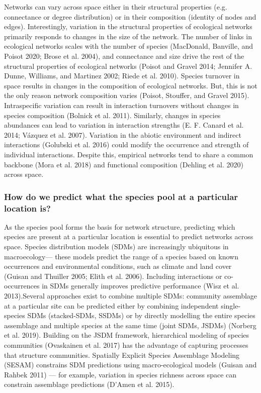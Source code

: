 \documentclass[11pt]{article}
\begin{document}
Networks can vary across space either in their structural properties
(e.g. connectance or degree distribution) or in their composition
(identity of nodes and edges). Interestingly, variation in the
structural properties of ecological networks primarily responds to
changes in the size of the network. The number of links in ecological
networks scales with the number of species (MacDonald, Banville, and
Poisot 2020; Brose et al. 2004), and connectance and size drive the rest
of the structural properties of ecological networks (Poisot and Gravel
2014; Jennifer A. Dunne, Williams, and Martinez 2002; Riede et al.
2010). Species turnover in space results in changes in the composition
of ecological networks. But, this is not the only reason network
composition varies (Poisot, Stouffer, and Gravel 2015). Intraspecific
variation can result in interaction turnovers without changes in species
composition (Bolnick et al. 2011). Similarly, changes in species
abundances can lead to variation in interaction strengths (E. F. Canard
et al. 2014; Vázquez et al. 2007). Variation in the abiotic environment
and indirect interactions (Golubski et al. 2016) could modify the
occurrence and strength of individual interactions. Despite this,
empirical networks tend to share a common backbone (Mora et al. 2018)
and functional composition (Dehling et al. 2020) across space.

\hypertarget{how-do-we-predict-what-the-species-pool-at-a-particular-location-is}{%
\subsubsection{How do we predict what the species pool at a particular
location
is?}\label{how-do-we-predict-what-the-species-pool-at-a-particular-location-is}}

As the species pool forms the basis for network structure, predicting
which species are present at a particular location is essential to
predict networks across space. Species distribution models (SDMs) are
increasingly ubiquitous in macroecology--- these models predict the
range of a species based on known occurrences and environmental
conditions, such as climate and land cover (Guisan and Thuiller 2005;
Elith et al. 2006). Including interactions or co-occurrences in SDMs
generally improves predictive performance (Wisz et al. 2013).Several
approaches exist to combine multiple SDMs: community assemblage at a
particular site can be predicted either by combining independent
single-species SDMs (stacked-SDMs, SSDMs) or by directly modelling the
entire species assemblage and multiple species at the same time (joint
SDMs, JSDMs) (Norberg et al. 2019). Building on the JSDM framework,
hierarchical modeling of species communities (Ovaskainen et al. 2017)
has the advantage of capturing processes that structure communities.
Spatially Explicit Species Assemblage Modeling (SESAM) constrains SDM
predictions using macro-ecological models (Guisan and Rahbek 2011) ---
for example, variation in species richness across space can constrain
assemblage predictions (D'Amen et al. 2015).
\end{document}
